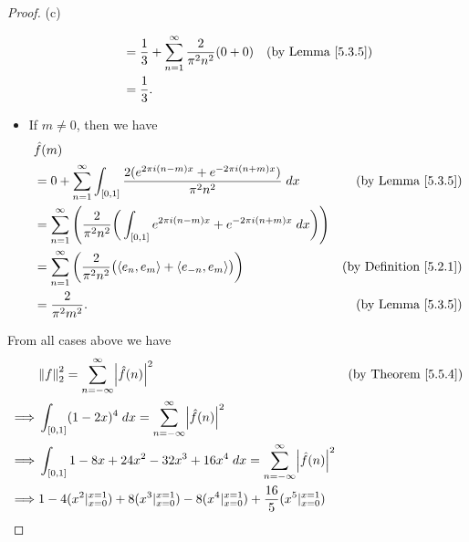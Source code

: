 \begin{proof}{(c)}
\begin{itemize}
\begin{align*}
                             & = \frac{1}{3} + \sum_{n = 1}^\infty \frac{2}{\pi^2 n^2} (0 + 0)                                                                       & \text{(by Lemma \ref{5.3.5})}      \\
                             & = \frac{1}{3}.
              \end{align*}
        \item If \(m \neq 0\), then we have
              \begin{align*}
                   & \hat{f}(m)                                                                                                                                                                 \\
                   & = 0 + \sum_{n = 1}^\infty \int_{[0, 1]} \frac{2 (e^{2 \pi i (n - m) x} + e^{- 2 \pi i (n + m) x})}{\pi^2 n^2} \; dx                   & \text{(by Lemma \ref{5.3.5})}      \\
                   & = \sum_{n = 1}^\infty \Bigg(\frac{2}{\pi^2 n^2} \bigg(\int_{[0, 1]} e^{2 \pi i (n - m) x} + e^{- 2 \pi i (n + m) x} \; dx\bigg)\Bigg)                                      \\
                   & = \sum_{n = 1}^\infty \bigg(\frac{2}{\pi^2 n^2} \big(\inner*{e_n, e_m} + \inner*{e_{-n}, e_m}\big)\bigg)                              & \text{(by Definition \ref{5.2.1})} \\
                   & = \frac{2}{\pi^2 m^2}.                                                                                                                & \text{(by Lemma \ref{5.3.5})}
              \end{align*}
    \end{itemize}
    From all cases above we have
    \begin{align*}
                 & \norm*{f}_2^2 = \sum_{n = -\infty}^\infty \abs{\hat{f}(n)}^2                                                                     & \text{(by Theorem \ref{5.5.4})} \\
        \implies & \int_{[0, 1]} (1 - 2x)^4 \; dx = \sum_{n = -\infty}^\infty \abs{\hat{f}(n)}^2                                                                                      \\
        \implies & \int_{[0, 1]} 1 - 8x + 24x^2 - 32x^3 + 16x^4 \; dx = \sum_{n = -\infty}^\infty \abs{\hat{f}(n)}^2                                                                  \\
        \implies & 1 - 4 (x^2|_{x = 0}^{x = 1}) + 8 (x^3|_{x = 0}^{x = 1}) - 8(x^4|_{x = 0}^{x = 1}) + \frac{16}{5}(x^5|_{x = 0}^{x = 1})                                             \\

\end{align*}
\end{proof}
